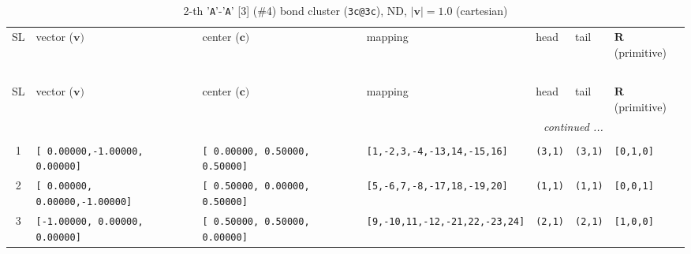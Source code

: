 \documentclass[fleqn,10pt,landscape]{jsarticle}
\begin{document}
\begin{longtable}[l]{cllllll}
\captionsetup{justification=raggedright, singlelinecheck=off}
\caption{2-th '\texttt{A}'-'\texttt{A}' [3] (\#4) bond cluster (\texttt{3c@3c}), ND, $|\bm{v}|=1.0$ (cartesian)}
 \\
 \hline \hline
SL & vector ($\bm{v})$ & center ($\bm{c})$ & mapping & head & tail & $\bm{R}$ (primitive) \\ \hline \endfirsthead

\multicolumn{6}{l}{\tablename\ \thetable{}} \\
 \hline \hline
SL & vector ($\bm{v})$ & center ($\bm{c})$ & mapping & head & tail & $\bm{R}$ (primitive) \\ \hline \endhead

 \hline \hline
\multicolumn{6}{r}{\footnotesize\it continued ...} \\ \endfoot

 \hline \hline
\multicolumn{6}{r}{} \\ \endlastfoot

1 & \texttt{[ 0.00000,-1.00000, 0.00000]} & \texttt{[ 0.00000, 0.50000, 0.50000]} & \texttt{[1,-2,3,-4,-13,14,-15,16]} & \texttt{(3,1)} & \texttt{(3,1)} & \texttt{[0,1,0]} \\ \hline
2 & \texttt{[ 0.00000, 0.00000,-1.00000]} & \texttt{[ 0.50000, 0.00000, 0.50000]} & \texttt{[5,-6,7,-8,-17,18,-19,20]} & \texttt{(1,1)} & \texttt{(1,1)} & \texttt{[0,0,1]} \\ \hline
3 & \texttt{[-1.00000, 0.00000, 0.00000]} & \texttt{[ 0.50000, 0.50000, 0.00000]} & \texttt{[9,-10,11,-12,-21,22,-23,24]} & \texttt{(2,1)} & \texttt{(2,1)} & \texttt{[1,0,0]} \\
\end{longtable}
\end{document}
